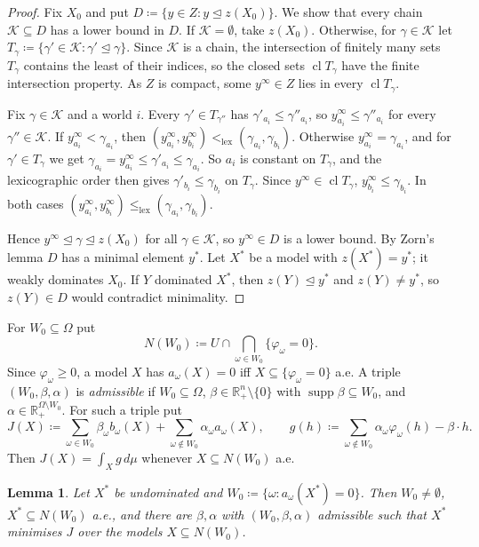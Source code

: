 \documentclass[11pt]{article}
\newcommand{\R}{\mathbb{R}}
\newcommand{\lexle}{\le_{\mathrm{lex}}}
\newcommand{\lexlt}{<_{\mathrm{lex}}}
\DeclareMathOperator{\supp}{supp}
\DeclareMathOperator{\cl}{cl}
\theoremstyle{plain}
\newtheorem{lemma}[theorem]{Lemma}
\theoremstyle{definition}
\theoremstyle{remark}
\begin{document}
\begin{proof}
Fix $X_0$ and put $D\coloneqq\{y\in Z:y\trianglelefteq z(X_0)\}$. We show that every chain
$\mathcal K\subseteq D$ has a lower bound in $D$. If $\mathcal K=\emptyset$, take
$z(X_0)$. Otherwise, for $\gamma\in\mathcal K$ let $T_\gamma\coloneqq\{\gamma'\in
\mathcal K:\gamma'\trianglelefteq\gamma\}$. Since $\mathcal K$ is a chain, the intersection of finitely
many sets $T_\gamma$ contains the least of their indices, so the closed sets $\cl T_\gamma$
have the finite intersection property. As $Z$ is compact, some $y^\infty\in Z$ lies in every $\cl
T_\gamma$.

Fix $\gamma\in\mathcal K$ and a world $i$. Every $\gamma'\in T_{\gamma''}$ has
$\gamma'_{a_i}\le\gamma''_{a_i}$, so $y^\infty_{a_i}\le\gamma''_{a_i}$ for every
$\gamma''\in\mathcal K$. If $y^\infty_{a_i}<\gamma_{a_i}$, then
$(y^\infty_{a_i},y^\infty_{b_i})\lexlt(\gamma_{a_i},\gamma_{b_i})$. Otherwise
$y^\infty_{a_i}=\gamma_{a_i}$, and for $\gamma'\in T_\gamma$ we get $\gamma_{a_i}=
y^\infty_{a_i}\le\gamma'_{a_i}\le\gamma_{a_i}$. So $a_i$ is constant on $T_\gamma$, and
the lexicographic order then gives $\gamma'_{b_i}\le\gamma_{b_i}$ on $T_\gamma$. Since
$y^\infty\in\cl T_\gamma$, $y^\infty_{b_i}\le\gamma_{b_i}$. In both cases
$(y^\infty_{a_i},y^\infty_{b_i})\lexle(\gamma_{a_i},\gamma_{b_i})$.

Hence $y^\infty\trianglelefteq\gamma\trianglelefteq z(X_0)$ for all $\gamma\in\mathcal K$,
so $y^\infty\in D$ is a lower bound. By Zorn's lemma $D$ has a minimal element $y^\ast$.
Let $X^\ast$ be a model with $z(X^\ast)=y^\ast$; it weakly dominates $X_0$. If $Y$
dominated $X^\ast$, then $z(Y)\trianglelefteq y^\ast$ and $z(Y)\neq y^\ast$, so $z(Y)\in
D$ would contradict minimality.
\end{proof}

For $W_0\subseteq\Omega$ put
\[
  N(W_0)\coloneqq U\cap\bigcap_{\omega\in W_0}\{\varphi_\omega=0\}.
\]
Since $\varphi_\omega\ge0$, a model $X$ has $a_\omega(X)=0$ iff $X\subseteq
\{\varphi_\omega=0\}$ a.e. A triple $(W_0,\beta,\alpha)$ is \emph{admissible} if
$W_0\subseteq\Omega$, $\beta\in\R^n_+\setminus\{0\}$ with $\supp\beta\subseteq W_0$, and
$\alpha\in\R_+^{\Omega\setminus W_0}$. For such a triple put
\[
  J(X)\coloneqq\sum_{\omega\in W_0}\beta_\omega b_\omega(X)
    +\sum_{\omega\notin W_0}\alpha_\omega a_\omega(X),\qquad
  g(h)\coloneqq\sum_{\omega\notin W_0}\alpha_\omega\varphi_\omega(h)-\beta\cdot h .
\]
Then $J(X)=\int_Xg\,d\mu$ whenever $X\subseteq N(W_0)$ a.e.

\begin{lemma}\label{lem:sep}
Let $X^\ast$ be undominated and $W_0\coloneqq\{\omega:a_\omega(X^\ast)=0\}$. Then $W_0\neq
\emptyset$, $X^\ast\subseteq N(W_0)$ a.e., and there are $\beta,\alpha$ with
$(W_0,\beta,\alpha)$ admissible such that $X^\ast$ minimises $J$ over the models $X\subseteq
N(W_0)$.
\end{lemma}
\end{document}
